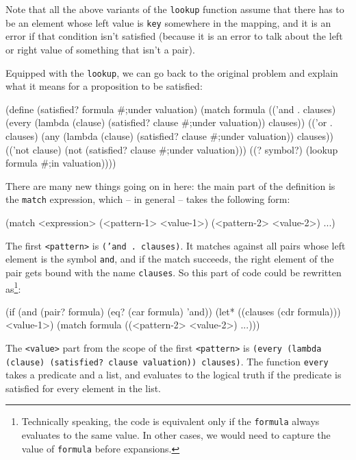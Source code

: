 Note that all the above variants of the \texttt{lookup}
function assume that there has to be an element whose
left value is \texttt{key} somewhere in the mapping,
and it is an error if that condition isn't satisfied
(because it is an error to talk about the left or right
value of something that isn't a pair).

Equipped with the \texttt{lookup}, we can go back
to the original problem and explain what it means
for a proposition to be satisfied:

\begin{Snippet}
(define (satisfied? formula #;under valuation)
  (match formula
    (('and . clauses)
     (every (lambda (clause)
              (satisfied? clause #;under valuation))
            clauses))
    (('or . clauses)
     (any (lambda (clause)
            (satisfied? clause #;under valuation))
          clauses))
    (('not clause)
     (not (satisfied? clause #;under valuation)))
    ((? symbol?)
     (lookup formula #;in valuation))))
\end{Snippet}

There are many new things going on in here: the
main part of the definition is the \texttt{match}
expression, which -- in general -- takes the following
form:

\begin{Snippet}
(match <expression> 
  (<pattern-1> <value-1>) 
  (<pattern-2> <value-2>)
  ...)
\end{Snippet}

The first \texttt{<pattern>} is \texttt{('and . clauses)}.
It matches against all pairs whose left element is the symbol
\texttt{and}, and if the match succeeds, the right element
of the pair gets bound with the name \texttt{clauses}.
So this part of code could be rewritten as\footnote{Technically
speaking, the code is equivalent only if the \texttt{formula}
always evaluates to the same value. In other cases, we would
need to capture the value of \texttt{formula} before expansions.}:
\begin{Snippet}
(if (and (pair? formula) (eq? (car formula) 'and))
  (let* ((clauses (cdr formula)))
    <value-1>)
  (match formula
    ((<pattern-2> <value-2>)
     ...)))
\end{Snippet}

The \texttt{<value>} part from the scope of the first
\texttt{<pattern>} is
\texttt{(every (lambda (clause) (satisfied? clause valuation)) clauses)}.
The function \texttt{every} takes a predicate and a list, and
evaluates to the logical truth if the predicate is satisfied
for every element in the list.


